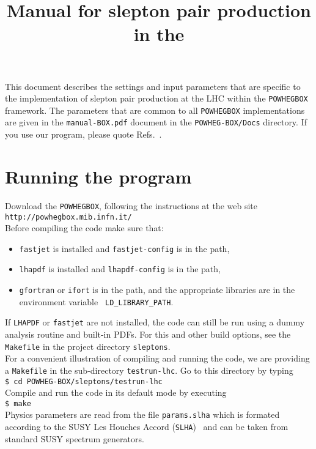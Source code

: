 \documentclass[a4paper,11pt]{article}
\title{Manual for slepton pair production in the \POWHEGBOX{}}
\date{}
\newcommand\POWHEGBOX{{\tt POWHEG\;BOX}}
\begin{document}
\maketitle
%
\noindent
This document describes the settings and input parameters that are specific to
the implementation of slepton pair production at the LHC within the
\POWHEGBOX{} framework. 
%
The parameters that are common to all \POWHEGBOX{} implementations are given in
the {\tt manual-BOX.pdf} document in the {\tt POWHEG-BOX/Docs}
directory.
If you use our program, please quote
Refs.~\cite{JMT,Alioli:2010xd,Ellis:2007qk,vanOldenborgh:1990yc,Hahn:2006nq,Sjostrand:2006za}.

\section*{Running the program}
%
Download the \POWHEGBOX{}, following the instructions at the web site 
\\[2ex]
{\tt http://powhegbox.mib.infn.it/}
\\[2ex] 
Before compiling the code make sure that:
\begin{itemize}
\item 
{\tt fastjet} is installed and {\tt fastjet-config} is in the path,
\item 
{\tt lhapdf} is installed and {\tt lhapdf-config} is in the path,
\item
{\tt gfortran} or {\tt ifort} is in the path, and the
appropriate libraries are in the environment variable {\tt
  LD\_LIBRARY\_PATH}. 
\end{itemize}
%
If {\tt LHAPDF} or {\tt fastjet} are not installed, the code can still
be run using a dummy analysis routine and built-in PDFs.
For this and other build options, see the {\tt Makefile} in the project
directory {\tt sleptons}.
%
\\[2ex]
For a convenient illustration of compiling and running the code,
we are providing a {\tt Makefile} in the sub-directory {\tt testrun-lhc}.
Go to this directory by typing
\\[2ex]
{\tt \$ cd POWHEG-BOX/sleptons/testrun-lhc}
\\[2ex]
Compile and run the code in its default mode by executing
\\[2ex]
{\tt \$ make}
%
%
\\[2ex]
Physics parameters are read from the file {\tt params.slha} which is formated 
according to the SUSY Les Houches Accord ({\tt SLHA})~\cite{Skands:2003cj,Allanach:2008qq} and can be taken from standard SUSY spectrum generators.
\end{document}
